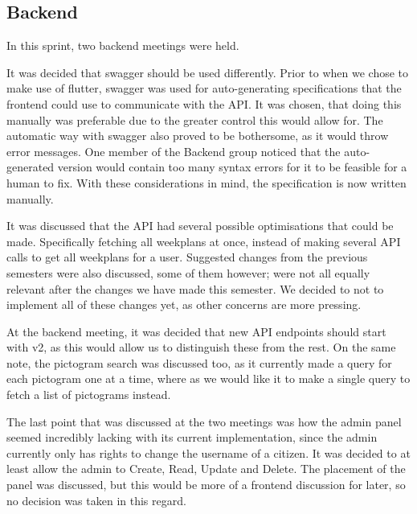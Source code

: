 \subsection{Backend}
In this sprint, two backend meetings were held.

It was decided that swagger should be used differently.
Prior to when we chose to make use of flutter, swagger was used for auto-generating specifications that the frontend could use to communicate with the API.
It was chosen, that doing this manually was preferable due to the greater control this would allow for.
The automatic way with swagger also proved to be bothersome, as it would throw error messages.
One member of the Backend group noticed that the auto-generated version would contain too many syntax errors for it to be feasible for a human to fix.
With these considerations in mind, the specification is now written manually.

It was discussed that the API had several possible optimisations that could be made.
Specifically fetching all weekplans at once, instead of making several API calls to get all weekplans for a user.
Suggested changes from the previous semesters were also discussed, some of them however; were not all equally relevant after the changes we have made this semester.
We decided to not to implement all of these changes yet, as other concerns are more pressing.

At the backend meeting, it was decided that new API endpoints should start with v2, as this would allow us to distinguish these from the rest.
On the same note, the pictogram search was discussed too, as it currently made a query for each pictogram one at a time, where as we would like it to make a single query to fetch a list of pictograms instead.

The last point that was discussed at the two meetings was how the admin panel seemed incredibly lacking with its current implementation, since the admin currently only has rights to change the username of a citizen. 
It was decided to at least allow the admin to Create, Read, Update and Delete. 
The placement of the panel was discussed, but this would be more of a frontend discussion for later, so no decision was taken in this regard.

